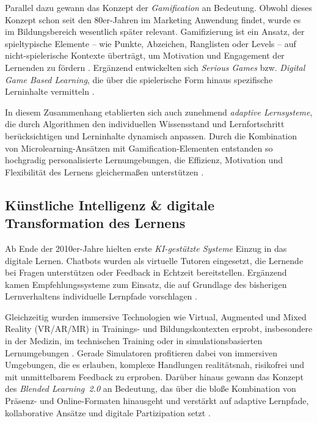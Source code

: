 Parallel dazu gewann das Konzept der \textit{Gamification} an Bedeutung. Obwohl dieses Konzept schon seit den 80er-Jahren im Marketing Anwendung findet, wurde es im Bildungsbereich wesentlich später relevant. Gamifizierung ist ein Ansatz, der spieltypische Elemente – wie Punkte, Abzeichen, Ranglisten oder Levels – auf nicht-spielerische Kontexte überträgt, um Motivation und Engagement der Lernenden zu fördern \parencite[S.~452]{schlag_gamifizierung_2021}. Ergänzend entwickelten sich \textit{Serious Games} bzw. \textit{Digital Game Based Learning}, die über die spielerische Form hinaus spezifische Lerninhalte vermitteln \parencite[S.~14]{niegemann_kompendium_2008}.

In diesem Zusammenhang etablierten sich auch zunehmend \textit{adaptive Lernsysteme}, die durch Algorithmen den individuellen Wissensstand und Lernfortschritt berücksichtigen und Lerninhalte dynamisch anpassen. Durch die Kombination von Microlearning-Ansätzen mit Gamification-Elementen entstanden so hochgradig personalisierte Lernumgebungen, die Effizienz, Motivation und Flexibilität des Lernens gleichermaßen unterstützen \parencite[S.~1f]{katsaris_adaptive_2021}.

\subsection{Künstliche Intelligenz \& digitale Transformation des Lernens}

Ab Ende der 2010er-Jahre hielten erste \textit{KI-gestützte Systeme} Einzug in das digitale Lernen. Chatbots wurden als virtuelle Tutoren eingesetzt, die Lernende bei Fragen unterstützen oder Feedback in Echtzeit bereitstellen. Ergänzend kamen Empfehlungssysteme zum Einsatz, die auf Grundlage des bisherigen Lernverhaltens individuelle Lernpfade vorschlagen \parencites[S.~1f]{harry_role_2023}[S.~42ff]{zhai_review_2021}.

Gleichzeitig wurden immersive Technologien wie Virtual, Augmented und Mixed Reality (VR/AR/MR) in Trainings- und Bildungskontexten erprobt, insbesondere in der Medizin, im technischen Training oder in simulationsbasierten Lernumgebungen \parencites[S.~3f]{rocha_bicalho_use_2023}[S.~251]{anatolevna_kastornova_international_2022}[S.~2f]{radianti_systematic_2020}. Gerade Simulatoren profitieren dabei von immersiven Umgebungen, die es erlauben, komplexe Handlungen realitätsnah, risikofrei und mit unmittelbarem Feedback zu erproben. Darüber hinaus gewann das Konzept des \textit{Blended Learning~2.0} an Bedeutung, das über die bloße Kombination von Präsenz- und Online-Formaten hinausgeht und verstärkt auf adaptive Lernpfade, kollaborative Ansätze und digitale Partizipation setzt \parencites{seufert_schulleitertagung_2014}{news_aktuell_gmbh_e-learning_2025}.

